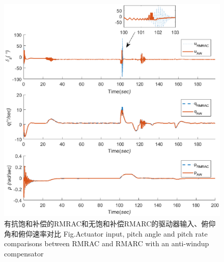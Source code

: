\begin{figure}[!htp]%
\includegraphics[width=1\linewidth]{figure/chap6/Fig6_cmdpulse_2_mag.eps}
\label{fig:chap6:F14}
 {有抗饱和补偿的RMRAC和无饱和补偿RMARC的驱动器输入、俯仰角和俯仰速率对比} {Fig.}{Actuator input, pitch angle and pitch rate comparisons between RMRAC and RMARC with an anti-windup compensator}
\end{figure}

